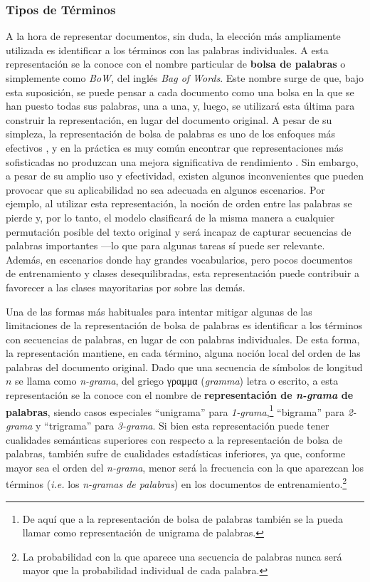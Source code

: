 \subsubsection{Tipos de Términos}
\label{sec:tipo-termino}

A la hora de representar documentos, sin duda, la elección más ampliamente utilizada es identificar a los términos con las palabras individuales. A esta representación se la conoce con el nombre particular de \textbf{bolsa de palabras} o simplemente como \emph{BoW}, del inglés \emph{Bag of Words}. 
Este nombre surge de que, bajo esta suposición, se puede pensar a cada documento como una bolsa en la que se han puesto todas sus palabras, una a una, y, luego, se utilizará esta última para construir la representación, en lugar del documento original.
A pesar de su simpleza, la representación de bolsa de palabras es uno de los  enfoques más efectivos \cite{nguyen2013old,stamatatos2009survey,sebastiani2002machine}, y en la práctica es muy común encontrar que representaciones más sofisticadas no produzcan una mejora significativa de rendimiento \cite{apte1994automated,dumais1998inductive,lewis1992evaluation}.
Sin embargo, a pesar de su amplio uso y efectividad, existen algunos inconvenientes que pueden provocar que su aplicabilidad no sea adecuada en algunos escenarios.
Por ejemplo, al utilizar esta representación, la noción de orden entre las palabras se pierde y, por lo tanto, el modelo clasificará de la misma manera a cualquier permutación posible del texto original y será incapaz de capturar secuencias de palabras importantes ---lo que para algunas tareas sí puede ser relevante. Además, en escenarios donde hay grandes vocabularios, pero pocos documentos de entrenamiento y clases desequilibradas, esta representación puede contribuir a favorecer a las clases mayoritarias por sobre las demás\cite{stamatatos2008author}.

Una de las formas más habituales para intentar mitigar algunas de las limitaciones de la representación de bolsa de palabras es identificar a los términos con secuencias de palabras, en lugar de con palabras individuales. De esta forma, la representación mantiene, en cada término, alguna noción local del orden de las palabras del documento original.
Dado que una secuencia de símbolos de longitud $n$ se llama como \emph{n-grama}, del griego \textgreek{γραμμα} (\emph{gramma}) letra o escrito, a esta representación se la conoce con el nombre de \textbf{representación de \emph{n-grama} de palabras}, siendo casos especiales ``unigrama'' para \emph{1-grama},\footnote{De aquí que a la representación de bolsa de palabras también se la pueda llamar como representación de unigrama de palabras.} ``bigrama'' para \emph{2-grama} y ``trigrama'' para \emph{3-grama}.
Si bien esta representación puede tener cualidades semánticas superiores con respecto a la representación de bolsa de palabras, también sufre de cualidades estadísticas inferiores, ya que, conforme mayor sea el orden del \emph{n-grama}, menor será la frecuencia con la que aparezcan los términos (\emph{i.e.} los \emph{n-gramas de palabras}) en los documentos de entrenamiento\cite{lewis1992evaluation}.\footnote{La probabilidad con la que aparece una secuencia de palabras nunca será mayor que la probabilidad individual de cada palabra.}

